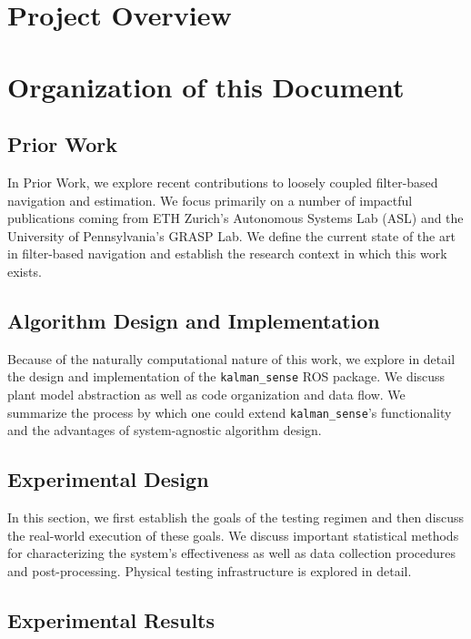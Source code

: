 \section{Project Overview}


\section{Organization of this Document}

\subsection*{Prior Work}

In Prior Work, we explore recent contributions to loosely coupled filter-based navigation and estimation. We focus primarily on a number of impactful publications coming from ETH Zurich's Autonomous Systems Lab (ASL) and the University of Pennsylvania's GRASP Lab. We define the current state of the art in filter-based navigation and establish the research context in which this work exists.

\subsection*{Algorithm Design and Implementation}

Because of the naturally computational nature of this work, we explore in detail the design and implementation of the \texttt{kalman\_sense} ROS package. We discuss plant model abstraction as well as code organization and data flow. We summarize the process by which one could extend \texttt{kalman\_sense}'s functionality and the advantages of system-agnostic algorithm design.

\subsection*{Experimental Design}

In this section, we first establish the goals of the testing regimen and then discuss the real-world execution of these goals. We discuss important statistical methods for characterizing the system's effectiveness as well as data collection procedures and post-processing. Physical testing infrastructure is explored in detail.

\subsection*{Experimental Results}

